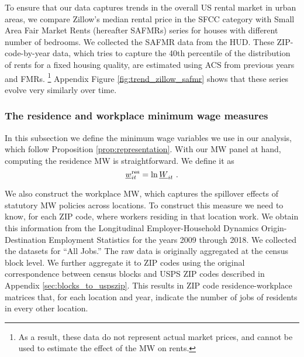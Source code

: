To ensure that our data captures trends in the overall US rental market in 
urban areas, we compare Zillow's median rental price in the SFCC category with 
Small Area Fair Market Rents (hereafter SAFMRs) series for houses with 
different number of bedrooms.
We collected the SAFMR data from the HUD.
These ZIP-code-by-year data, which tries to capture the 40th percentile of the 
distribution of rents for a fixed housing quality, are estimated using ACS from
previous years and FMRs.%
\footnote{As a result, these data do not represent actual market prices, and 
cannot be used to estimate the effect of the MW on rents.}
%
%
Appendix Figure \ref{fig:trend_zillow_safmr} shows that these series evolve
very similarly over time.

\subsubsection{The residence and workplace minimum wage measures}
\label{sec:data_mw_measures}

In this subsection we define the minimum wage variables we use in our analysis,
which follow Proposition \ref{prop:representation}.
With our MW panel at hand, computing the residence MW is straightforward.
We define it as
\begin{equation*}
    \underline{w}^{\text{res}}_{it} = \ln \underline{W}_{it} \ .
\end{equation*}

We also construct the workplace MW, which captures the spillover effects of
statutory MW policies across locations.
To construct this measure we need to know, for each ZIP code, where workers 
residing in that location work.
We obtain this information from the Longitudinal Employer-Household 
Dynamics Origin-Destination Employment Statistics \parencite[LODES;][]{CensusLODES}
for the years 2009 through 2018.
We collected the datasets for ``All Jobs.''
The raw data is originally aggregated at the census block level. 
We further aggregate it to ZIP codes using the original correspondence between 
census blocks and USPS ZIP codes described in Appendix 
\ref{sec:blocks_to_uspszip}.
This results in ZIP code residence-workplace matrices that, for each location 
and year, indicate the number of jobs of residents in every other location.

